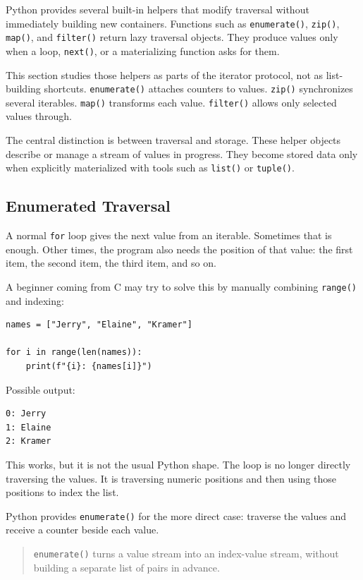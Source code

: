 \documentclass[a4paper,twoside]{report}
\begin{document}
Python provides several built-in helpers that modify traversal without immediately building new containers. Functions such as \texttt{enumerate()}, \texttt{zip()}, \texttt{map()}, and \texttt{filter()} return lazy traversal objects. They produce values only when a loop, \texttt{next()}, or a materializing function asks for them.

This section studies those helpers as parts of the iterator protocol, not as list-building shortcuts. \texttt{enumerate()} attaches counters to values. \texttt{zip()} synchronizes several iterables. \texttt{map()} transforms each value. \texttt{filter()} allows only selected values through.

The central distinction is between traversal and storage. These helper objects describe or manage a stream of values in progress. They become stored data only when explicitly materialized with tools such as \texttt{list()} or \texttt{tuple()}.

\subsection{Enumerated Traversal}

A normal \texttt{for} loop gives the next value from an iterable. Sometimes that is enough. Other times, the program also needs the position of that value: the first item, the second item, the third item, and so on.

A beginner coming from C may try to solve this by manually combining \texttt{range()} and indexing:

\begin{verbatim}
names = ["Jerry", "Elaine", "Kramer"]

for i in range(len(names)):
    print(f"{i}: {names[i]}")
\end{verbatim}

Possible output:

\begin{verbatim}
0: Jerry
1: Elaine
2: Kramer
\end{verbatim}

This works, but it is not the usual Python shape. The loop is no longer directly traversing the values. It is traversing numeric positions and then using those positions to index the list.

Python provides \texttt{enumerate()} for the more direct case: traverse the values and receive a counter beside each value.

\begin{quote}
\texttt{enumerate()} turns a value stream into an index-value stream, without building a separate list of pairs in advance.
\end{quote}
\end{document}
